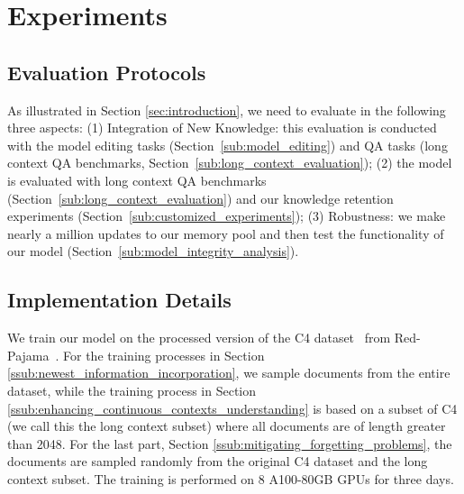 \vspace{-5pt}
\section{Experiments}
\vspace{-5pt}
\subsection{Evaluation Protocols}
\vspace{-5pt}
As illustrated in Section \ref{sec:introduction}, we need to evaluate \ours in the following three aspects: (1) Integration of New Knowledge: this evaluation is conducted with the model editing tasks (Section~\ref{sub:model_editing}) and QA tasks (long context QA benchmarks, Section~\ref{sub:long_context_evaluation}); 
(2) 
the model is evaluated with long context QA benchmarks (Section~\ref{sub:long_context_evaluation}) and our knowledge retention experiments (Section~\ref{sub:customized_experiments}); (3) Robustness: we make nearly a million updates to our memory pool and then test the functionality of our model (Section~\ref{sub:model_integrity_analysis}).

\vspace{-5pt}
\subsection{Implementation Details}
\vspace{-5pt}
We train our model on the processed version of the C4 dataset~\citep{c4} from Red-Pajama~\citep{together2023redpajama}. For the training processes in Section \ref{ssub:newest_information_incorporation}, we sample documents from the entire dataset, while the training process in Section \ref{ssub:enhancing_continuous_contexts_understanding} is based on a subset of C4 (we call this the long context subset) where all documents are of length greater than 2048. For the last part, Section \ref{ssub:mitigating_forgetting_problems}, the documents are sampled randomly from the original C4 dataset and the long context subset. The training is performed on 8 A100-80GB GPUs for three days.  

